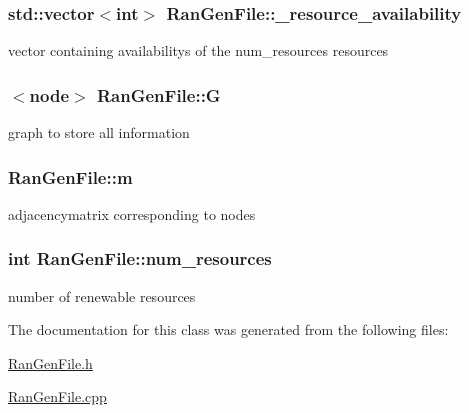 \subsubsection[{\+\_\+resource\+\_\+availability}]{\setlength{\rightskip}{0pt plus 5cm}std\+::vector$<$int$>$ Ran\+Gen\+File\+::\+\_\+resource\+\_\+availability\hspace{0.3cm}{\ttfamily [private]}}\label{class_ran_gen_file_acda50b98a19bab75de33540ab7811500}
vector containing availabilitys of the num\+\_\+resources resources \hypertarget{class_ran_gen_file_ae1ab1e4afb3e3b9913359ea29c983ad6}{}
\subsubsection[{G}]{$<${\bf node}$>$ Ran\+Gen\+File\+::\+G\hspace{0.3cm}{\ttfamily [private]}}\label{class_ran_gen_file_ae1ab1e4afb3e3b9913359ea29c983ad6}
graph to store all information \hypertarget{class_ran_gen_file_ae182f5083556f37272e1b71eed5d42fc}{}
\subsubsection[{m}]{ Ran\+Gen\+File\+::m\hspace{0.3cm}{\ttfamily [private]}}\label{class_ran_gen_file_ae182f5083556f37272e1b71eed5d42fc}
adjacencymatrix corresponding to nodes \hypertarget{class_ran_gen_file_a97c8732fd545bc26cf0b50af98e52ecb}{}
\subsubsection[{num\+\_\+resources}]{\setlength{\rightskip}{0pt plus 5cm}int Ran\+Gen\+File\+::num\+\_\+resources\hspace{0.3cm}{\ttfamily [private]}}\label{class_ran_gen_file_a97c8732fd545bc26cf0b50af98e52ecb}
number of renewable resources 

The documentation for this class was generated from the following files\+:\begin{DoxyCompactItemize}
\item 
\hyperlink{_ran_gen_file_8h}{Ran\+Gen\+File.\+h}\item 
\hyperlink{_ran_gen_file_8cpp}{Ran\+Gen\+File.\+cpp}\end{DoxyCompactItemize}
